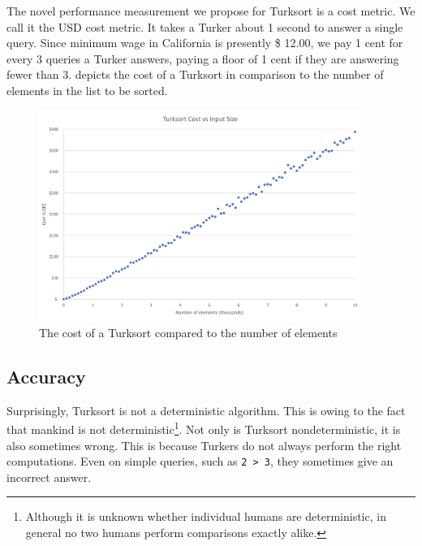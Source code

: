 \documentclass{article}
\begin{document}
The novel performance measurement we propose for Turksort is a cost metric. We
call it the USD cost metric. It takes a Turker about 1 second to answer a single
query. Since minimum wage in California is presently \$ 12.00, we pay 1 cent for
every 3 queries a Turker answers, paying a floor of 1 cent if they are answering
fewer than 3.  depicts the cost of a Turksort in comparison to
the number of elements in the list to be sorted.

\begin{figure}
  \centering
  \includegraphics[width=300pt]{costs.png}
  \caption{The cost of a Turksort compared to the number of elements}
  \label{fig:costs}
\end{figure}

\subsection{Accuracy}
Surprisingly, Turksort is not a deterministic algorithm. This is owing to the
fact that mankind is not deterministic\footnote{Although it is unknown whether
  individual humans are deterministic, in general no two humans perform
  comparisons exactly alike.}. Not only is Turksort nondeterministic, it is also
sometimes wrong. This is because Turkers do not always perform the right
computations. Even on simple queries, such as \texttt{2 > 3}, they sometimes
give an incorrect answer.
\end{document}
